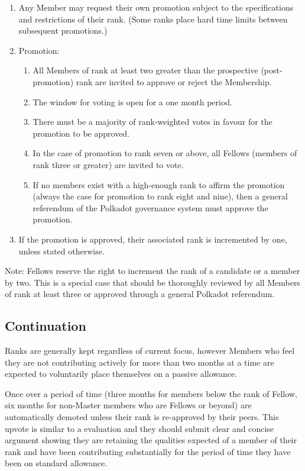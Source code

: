 \documentclass[9pt,oneside]{amsart}
\begin{document}
\begin{enumerate}
\item Any Member may request their own promotion subject to the specifications and restrictions of their rank. (Some ranks place hard time limits between subsequent promotions.)
\item Promotion:
  \begin{enumerate}
    \item All Members of rank at least two greater than the prospective (post-promotion) rank are invited to approve or reject the Membership.
    \item The window for voting is open for a one month period.
    \item There must be a majority of rank-weighted votes in favour for the promotion to be approved.
    \item In the case of promotion to rank seven or above, all Fellows (members of rank three or greater) are invited to vote.
    \item If no members exist with a high-enough rank to affirm the promotion (always the case for promotion to rank eight and nine), then a general referendum of the Polkadot governance system must approve the promotion.
  \end{enumerate}
\item If the promotion is approved, their associated rank is incremented by one, unless stated otherwise.
\end{enumerate}
Note: Fellows reserve the right to increment the rank of a candidate or a member by two. This is a special case that should be thoroughly reviewed by all Members of rank at least three or approved through a general Polkadot referendum.

\subsection{Continuation}

Ranks are generally kept regardless of current focus, however Members who feel they are not contributing actively for more than two months at a time are expected to voluntarily place themselves on a passive allowance.

Once over a period of time (three months for members below the rank of Fellow, six months for non-Master members who are Fellows or beyond) are automatically demoted unless their rank is re-approved by their peers. This upvote is similar to a evaluation and they should submit clear and concise argument showing they are retaining the qualities expected of a member of their rank and have been contributing substantially for the period of time they have been on standard allowance.
\end{document}
